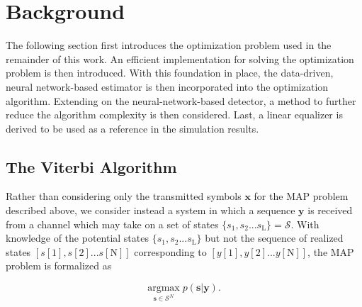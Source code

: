  
\section{Background}
The following section first introduces the optimization problem used in the remainder of this work. An efficient implementation for solving the optimization problem is then introduced. With this foundation in place, the data-driven, neural network-based estimator is then incorporated into the optimization algorithm. 
Extending on the neural-network-based detector, a method to further reduce the algorithm complexity is then considered. Last, a linear equalizer is derived to be used as a reference in the simulation results. 
\subsection{The Viterbi Algorithm}
Rather than considering only the transmitted symbols $\mathbf{x}$ for the MAP problem described above, we consider instead a system in which a sequence $\mathbf{y}$ is received from a channel which may take on a set of states $\{s_1, s_2... s_{\text{L}}\} = \mathcal{S}$. With knowledge of the potential states $\{s_1, s_2... s_{\text{L}}\}$ but not the sequence of realized states $[s[1], s[2]... s[\text{N}]]$ corresponding to $[y[1], y[2]... y[\text{N}]]$, the MAP problem is formalized as

\begin{equation*}
\underset{\mathbf{s}\in\mathcal{S}^N}{\text{argmax}} \; p(\mathbf{s}|\mathbf{y}).
\end{equation*} 

